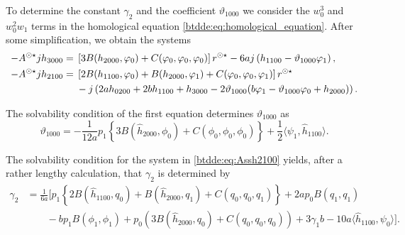 To determine the constant $\gamma_2$ and the coefficient $\vartheta_{1000}$ we
consider the $w_0^3$ and $w_0^2w_1$ terms in the homological equation \cref{btdde:eq:homological_equation}. After
some simplification, we obtain the systems
\begin{align}
\label{btdde:eq:Assh3000}
-A^{\odot\star} jh_{3000} ={}& \left[3 B(h_{2000},\varphi_0) + C(\varphi_0,\varphi_0,\varphi_0)\right]r^{\odot\star} 
                            - 6a j\left( h_{1100} - \vartheta_{1000} \varphi_1 \right), \\
\label{btdde:eq:Assh2100}
-A^{\odot\star} jh_{2100} ={}& \left[2 B(h_{1100},\varphi_0) + B(h_{2000},\varphi_1) + C(\varphi_0,\varphi_0,\varphi_1)\right]r^{\odot\star} \\
                         & - j \left( 2 a h_{0200} + 2 b h_{1100} + h_{3000} 
                            - 2 \vartheta_{1000} (b\varphi_1 - \vartheta_{1000}\varphi_0 +h_{2000})\right).
\end{align}

The solvability condition of the first equation determines $\vartheta_{1000}$ as
\begin{equation}
\label{btdde:eq:theta1000}
\vartheta_{1000} = -\frac1{12a} p_1 \left\{ 
			3B(\hat h_{2000},\phi_0) + C(\phi_0,\phi_0,\phi_0)
            \right\} + \frac12 \langle \psi_1, \hat h_{1100} \rangle .
\end{equation}

The solvability condition for the system in \cref{btdde:eq:Assh2100} yields, after a
rather lengthy calculation, that $\gamma_2$ is determined by 
\begin{align}
\label{btdde:eq:gamma_2}
\gamma_2 &= \frac1{6a} 
\bigg[ p_1\left\{ 2 B(\hat h_{1100},q_0) + B(\hat h_{2000},q_1) + C(q_0,q_0,q_1) \right\} 
        +2a p_0 B(q_1,q_1)  \nonumber \\
	& \qquad - b p_1 B(\phi_1,\phi_1) + p_0 \left( 3B(\hat h_{2000},q_0) + C(q_0,q_0,q_0) \right) 
    + 3 \gamma_1 b - 10 a \langle \hat h_{1100}, \psi_0 \rangle \bigg]. \nonumber 
\end{align}

